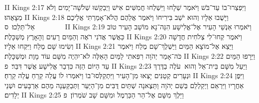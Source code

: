 II Kings 2:17	וַיִּפְצְרוּ־בוֹ עַד־בֹּשׁ וַיֹּאמֶר שְׁלָחוּ וַיִּשְׁלְחוּ חֲמִשִּׁים אִישׁ וַיְבַקְשׁוּ שְׁלֹשָׁה־יָמִים וְלֹא מְצָאֻהוּ׃
II Kings 2:18	וַיָּשֻׁבוּ אֵלָיו וְהוּא יֹשֵׁב בִּירִיחוֹ וַיֹּאמֶר אֲלֵהֶם הֲלֹא־אָמַרְתִּי אֲלֵיכֶם אַל־תֵּלֵכוּ׃ {ס}        
II Kings 2:19	וַיֹּאמְרוּ אַנְשֵׁי הָעִיר אֶל־אֱלִישָׁע הִנֵּה־נָא מוֹשַׁב הָעִיר טוֹב כַּאֲשֶׁר אֲדֹנִי רֹאֶה וְהַמַּיִם רָעִים וְהָאָרֶץ מְשַׁכָּלֶת׃
II Kings 2:20	וַיֹּאמֶר קְחוּ־לִי צְלֹחִית חֲדָשָׁה וְשִׂימוּ שָׁם מֶלַח וַיִּקְחוּ אֵלָיו׃
II Kings 2:21	וַיֵּצֵא אֶל־מוֹצָא הַמַּיִם וַיַּשְׁלֶךְ־שָׁם מֶלַח וַיֹּאמֶר כֹּה־אָמַר יְהֹוָה רִפִּאתִי לַמַּיִם הָאֵלֶּה לֹא־יִהְיֶה מִשָּׁם עוֹד מָוֶת וּמְשַׁכָּלֶת׃
II Kings 2:22	וַיֵּרָפוּ הַמַּיִם עַד הַיּוֹם הַזֶּה כִּדְבַר אֱלִישָׁע אֲשֶׁר דִּבֵּר׃ {פ}
II Kings 2:23	וַיַּעַל מִשָּׁם בֵּית־אֵל וְהוּא  עֹלֶה בַדֶּרֶךְ וּנְעָרִים קְטַנִּים יָצְאוּ מִן־הָעִיר וַיִּתְקַלְּסוּ־בוֹ וַיֹּאמְרוּ לוֹ עֲלֵה קֵרֵחַ עֲלֵה קֵרֵחַ׃
II Kings 2:24	וַיִּפֶן אַחֲרָיו וַיִּרְאֵם וַיְקַלְלֵם בְּשֵׁם יְהֹוָה וַתֵּצֶאנָה שְׁתַּיִם דֻּבִּים מִן־הַיַּעַר וַתְּבַקַּעְנָה מֵהֶם אַרְבָּעִים וּשְׁנֵי יְלָדִים׃
II Kings 2:25	וַיֵּלֶךְ מִשָּׁם אֶל־הַר הַכַּרְמֶל וּמִשָּׁם שָׁב שֹׁמְרוֹן׃ {פ}
